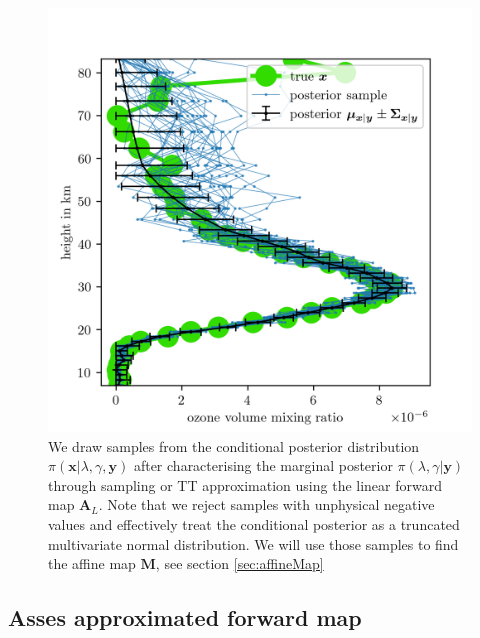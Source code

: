 \begin{figure}[ht!]
	\centering
	\includegraphics{FirstTestRes.png}
	\caption[Ozone samples of the conditional posterior.]{We draw samples from the conditional posterior distribution  $\pi(\bm{x}|\lambda,\gamma , \bm{y})$ after characterising the marginal posterior $\pi(\lambda,\gamma | \bm{y})$ through sampling or TT approximation using the linear forward map $\bm{A}_L$. Note that we reject samples with unphysical negative values and effectively treat the conditional posterior as a truncated multivariate normal distribution. We will use those samples to find the affine map $\bm{M}$, see section \ref{sec:affineMap}}
	\label{fig:O3Samp}
\end{figure}


\subsection{Asses approximated forward map}

